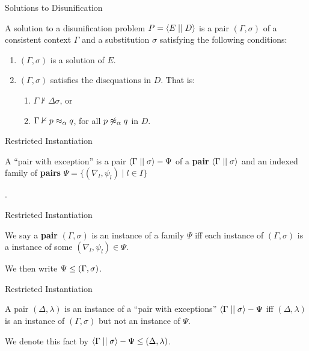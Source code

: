 \documentclass{beamer}
\begin{document}
    \begin{frame}{Solutions to Disunification}
        \begin{definition}
            A solution to a disunification problem $P = \left\langle E \mid\mid D \right\rangle$ is a pair $(\Gamma, \sigma)$ of a consistent context $\Gamma$ and a substitution $\sigma$ satisfying the following conditions:
            \begin{enumerate}
                \item $(\Gamma, \sigma)$ is a solution of $E$.
                \item $(\Gamma, \sigma)$ satisfies the disequations in $D$. That is:
                      \begin{enumerate}
                          \item $\Gamma \nvdash \Delta \sigma$, or
                          \item $\Gamma \nvdash p \mathrel{\approx_\alpha} q$, for all $p \mathrel{\not\approx_\alpha} q$ in $D$.
                      \end{enumerate}
            \end{enumerate}
        \end{definition}
    \end{frame}

    \begin{frame}{Restricted Instantiation}
        \begin{definition}
            A ``pair with exception'' is a pair $\left\langle \Gamma \mid\mid \sigma \right\rangle - \Psi$ of a \textbf{pair} $\left\langle \Gamma \mid\mid \sigma \right\rangle$ and an indexed family of \textbf{pairs} $\Psi = \{ (\nabla_l, \psi_l) \mid l \in I \}$
        \end{definition}.
    \end{frame}

    \begin{frame}{Restricted Instantiation}
        \begin{definition}
            We say a \textbf{pair} $(\Gamma, \sigma)$ is an instance of a family $\Psi$ iff each instance of $(\Gamma, \sigma)$ is a instance of some $(\nabla_l,\psi_l) \in \Psi$.

            We then write $\Psi \leq (\Gamma, \sigma)$.
        \end{definition}
    \end{frame}

    \begin{frame}{Restricted Instantiation}
        \begin{definition}
            A pair $(\Delta, \lambda)$ is an instance of a ``pair with exceptions'' $\left\langle \Gamma \mid\mid \sigma \right\rangle - \Psi$ iff $(\Delta, \lambda)$ is an instance of $(\Gamma, \sigma)$ but not an instance of $\Psi$.
        \end{definition}
        We denote this fact by $\left\langle \Gamma \mid\mid \sigma \right\rangle - \Psi \leq (\Delta, \lambda)$.
    \end{frame}
\end{document}
